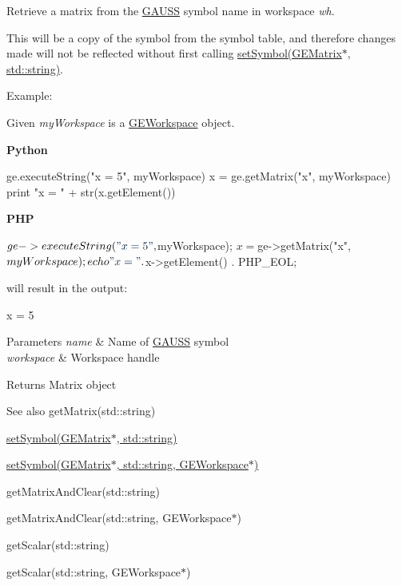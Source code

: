 Retrieve a matrix from the \hyperlink{class_g_a_u_s_s}{G\+A\+U\+SS} symbol name in workspace {\itshape wh}. 

This will be a copy of the symbol from the symbol table, and therefore changes made will not be reflected without first calling \hyperlink{class_g_a_u_s_s_ab51cbcd5a66ba3355f52bf10bf31f7e3}{set\+Symbol(\+G\+E\+Matrix$\ast$, std\+::string)}.

Example\+:

Given {\itshape my\+Workspace} is a \hyperlink{class_g_e_workspace}{G\+E\+Workspace} object.

{\bfseries Python} 
\begin{DoxyCode}
ge.executeString(\textcolor{stringliteral}{"x = 5"}, myWorkspace)
x = ge.getMatrix(\textcolor{stringliteral}{"x"}, myWorkspace)
\textcolor{keywordflow}{print} \textcolor{stringliteral}{"x = "} + str(x.getElement())
\end{DoxyCode}


{\bfseries P\+HP} 
\begin{DoxyCode}
$ge->executeString(\textcolor{stringliteral}{"x = 5"}, $myWorkspace);
$x = $ge->getMatrix(\textcolor{stringliteral}{"x"}, $myWorkspace);
echo \textcolor{stringliteral}{"x = "} . $x->getElement() . PHP\_EOL;
\end{DoxyCode}
 will result in the output\+: 
\begin{DoxyCode}
x = 5
\end{DoxyCode}



\begin{DoxyParams}{Parameters}
{\em name} & Name of \hyperlink{class_g_a_u_s_s}{G\+A\+U\+SS} symbol \\
\hline
{\em workspace} & Workspace handle \\
\hline
\end{DoxyParams}
\begin{DoxyReturn}{Returns}
Matrix object
\end{DoxyReturn}
\begin{DoxySeeAlso}{See also}
get\+Matrix(std\+::string) 

\hyperlink{class_g_a_u_s_s_ab51cbcd5a66ba3355f52bf10bf31f7e3}{set\+Symbol(\+G\+E\+Matrix$\ast$, std\+::string)} 

\hyperlink{class_g_a_u_s_s_a23181c31041882ce839f816ce56e1231}{set\+Symbol(\+G\+E\+Matrix$\ast$, std\+::string, G\+E\+Workspace$\ast$)} 

get\+Matrix\+And\+Clear(std\+::string) 

get\+Matrix\+And\+Clear(std\+::string, G\+E\+Workspace$\ast$) 

get\+Scalar(std\+::string) 

get\+Scalar(std\+::string, G\+E\+Workspace$\ast$) 
\end{DoxySeeAlso}
\mbox{\label{class_g_a_u_s_s_ad3561d1293dfe4af5336488b6d9a26f1}} 
